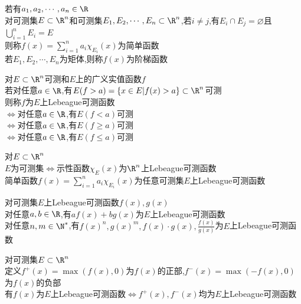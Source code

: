 \begin{dingyi}
若有$a_1,a_2,\cdots,a_n\in \R$\\
对可测集$E\subset\R^n$和可测集$E_1,E_2,\cdots,E_n\subset\R^n$,若$i\neq j$,有$E_i\cap E_j=\varnothing$且$\bigcup\limits_{i=1}^{n}E_i=E$\\
则称$f(x)=\sum\limits_{i=1}^{n}a_i\chi_{E_i}(x)$为简单函数\\
若$E_1,E_2,\cdots,E_n$为矩体,则称$f(x)$为阶梯函数
\end{dingyi}

\begin{dingyi}
对$E\subset\R^n$可测和$E$上的广义实值函数$f$\\
若对任意$a\in\R$,有$E(f>a)=\{x\in E|f(x)>a\}\subset \R^n$可测\\
则称$f$为$E$上Lebeague可测函数\\
$\Leftrightarrow$对任意$a\in\R$,有$E(f<a)$可测\\
$\Leftrightarrow$对任意$a\in\R$,有$E(f\geq a)$可测\\
$\Leftrightarrow$对任意$a\in\R$,有$E(f\leq a)$可测
\end{dingyi}

\begin{dingli}
对$E\subset\R^n$\\
$E$为可测集$\Leftrightarrow$示性函数$\chi_{E}(x)$为$\R^n$上Lebeague可测函数\\
简单函数$f(x)=\sum\limits_{i=1}^{n}a_i\chi_{E_i}(x)$为任意可测集$E$上Lebeague可测函数
\end{dingli}

\begin{dingli}
对可测集$E$上Lebeague可测函数$f(x),g(x)$\\
对任意$a,b\in\R$,有$af(x)+bg(x)$为$E$上Lebeague可测函数\\
对任意$n,m\in\N^*$,有$f(x)^n,g(x)^m,f(x)\cdot g(x),\frac{f(x)}{g(x)}$为$E$上Lebeague可测函数
\end{dingli}

\begin{tuilun}
对可测集$E\subset\R^n$\\
定义$f^{+}(x)=\max(f(x),0)$为$f(x)$的正部,$f^{-}(x)=\max(-f(x),0)$为$f(x)$的负部\\
有$f(x)$为$E$上Lebeague可测函数$\Leftrightarrow$$f^{+}(x),f^{-}(x)$均为$E$上Lebeague可测函数
\end{tuilun}

